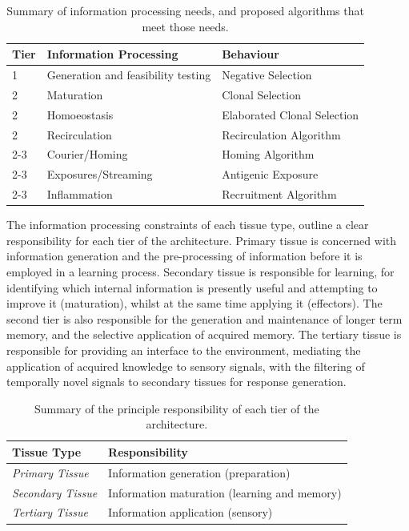 \begin{table}[ht]
	\centering\small
		\begin{tabular}{lll}
		\toprule
		\textbf{Tier} & \textbf{Information Processing} & Behaviour \\ 
		\toprule
		1 & Generation and feasibility testing & Negative Selection \\ 
		2 & Maturation & Clonal Selection \\ 
		2 & Homoeostasis & Elaborated Clonal Selection \\ 
		2 & Recirculation & Recirculation Algorithm \\ 
		2-3 & Courier/Homing & Homing Algorithm \\ 
		2-3 & Exposures/Streaming & Antigenic Exposure \\ 
		2-3 & Inflammation & Recruitment Algorithm \\ 
		\bottomrule
		\end{tabular}	
	\caption{Summary of information processing needs, and proposed algorithms that meet those needs.}
	\label{tab:tissue:architectures:algorithms}
\end{table}

The information processing constraints of each tissue type, outline a clear responsibility for each tier of the architecture. Primary tissue is concerned with information generation and the pre-processing of information before it is employed in a learning process. Secondary tissue is responsible for learning, for identifying which internal information is presently useful and attempting to improve it (maturation), whilst at the same time applying it (effectors). The second tier is also responsible for the generation and maintenance of longer term memory, and the selective application of acquired memory. The tertiary tissue is responsible for providing an interface to the environment, mediating the application of acquired knowledge to sensory signals, with the filtering of temporally novel signals to secondary tissues for response generation.

\begin{table}[ht]
	\centering\small
		\begin{tabular}{ll}
		\toprule
		\textbf{Tissue Type} & \textbf{Responsibility} \\ 
		\toprule
		\emph{Primary Tissue} & Information generation (preparation) \\ 
		\emph{Secondary Tissue} & Information maturation (learning and memory) \\ 
		\emph{Tertiary Tissue} & Information application (sensory) \\ 
		\bottomrule
		\end{tabular}	
	\caption{Summary of the principle responsibility of each tier of the architecture.}
	\label{tab:tissue:architectures:tiers}
\end{table}

